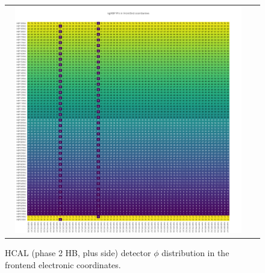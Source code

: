 \clearpage
\begin{figure}[htb]
 \begin{center}
  \begin{tabular}{cc}
   \includegraphics[angle=0,width=0.95\textwidth]{figures/appendix/ngHBP_Phi_in_FrontEnd.png}
  \end{tabular}
	\caption{HCAL (phase 2 HB, plus side) detector $\phi$ distribution in the frontend electronic coordinates.}
  \label{fig:lmapngHBPPhiFEC}
 \end{center}
\end{figure}


